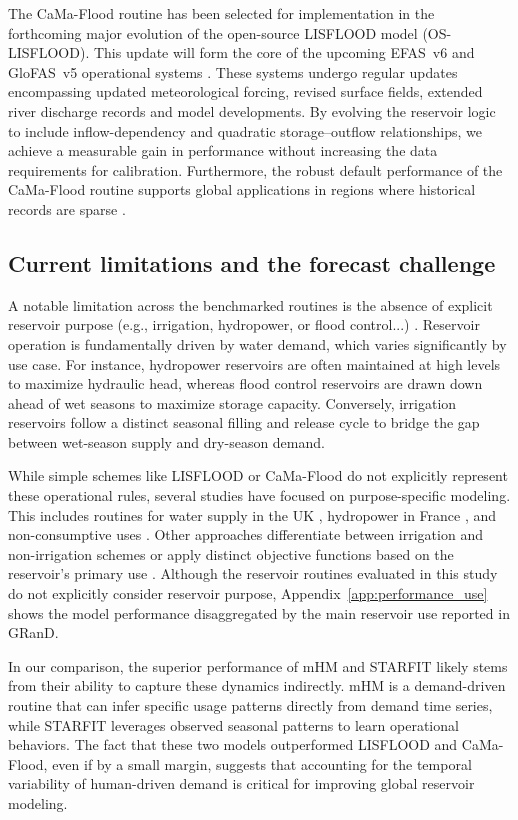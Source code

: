 \documentclass[hess, manuscript]{copernicus}
\begin{document}
The CaMa-Flood routine has been selected for implementation in the forthcoming major evolution of the open-source LISFLOOD model (OS-LISFLOOD). This update will form the core of the upcoming EFAS~v6 and GloFAS~v5 operational systems \citep{Salamon2025}. These systems undergo regular updates encompassing updated meteorological forcing, revised surface fields, extended river discharge records and model developments. By evolving the reservoir logic to include inflow-dependency and quadratic storage--outflow relationships, we achieve a measurable gain in performance without increasing the data requirements for calibration. Furthermore, the robust default performance of the CaMa-Flood routine supports global applications in regions where historical records are sparse \citep{Hanazaki2022}.

\subsection{Current limitations and the forecast challenge}
\label{sec:limitations}

A notable limitation across the benchmarked routines is the absence of explicit reservoir purpose (e.g., irrigation, hydropower, or flood control...) \citep{Shen2025}. Reservoir operation is fundamentally driven by water demand, which varies significantly by use case. For instance, hydropower reservoirs are often maintained at high levels to maximize hydraulic head, whereas flood control reservoirs are drawn down ahead of wet seasons to maximize storage capacity. Conversely, irrigation reservoirs follow a distinct seasonal filling and release cycle to bridge the gap between wet-season supply and dry-season demand. 

While simple schemes like LISFLOOD or CaMa-Flood do not explicitly represent these operational rules, several studies have focused on purpose-specific modeling. This includes routines for water supply in the UK \citep{Salwey2024}, hydropower in France \citep{Baratgin2024}, and non-consumptive uses \citep{Shrestha2024}. Other approaches differentiate between irrigation and non-irrigation schemes \citep{Hanasaki2006, Sadki2023} or apply distinct objective functions based on the reservoir's primary use \citep{Haddeland2006}. Although the reservoir routines evaluated in this study do not explicitly consider reservoir purpose, Appendix~\ref{app:performance_use} shows the model performance disaggregated by the main reservoir use reported in GRanD.

In our comparison, the superior performance of mHM and STARFIT likely stems from their ability to capture these dynamics indirectly. mHM is a demand-driven routine that can infer specific usage patterns directly from demand time series, while STARFIT leverages observed seasonal patterns to learn operational behaviors. The fact that these two models outperformed LISFLOOD and CaMa-Flood, even if by a small margin, suggests that accounting for the temporal variability of human-driven demand is critical for improving global reservoir modeling.
\end{document}
